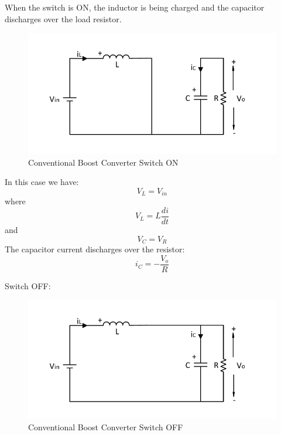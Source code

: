 When the switch is ON,
the inductor is being charged and the capacitor discharges over the load resistor.

\begin{figure}[H]
   \centering
   \includegraphics[width=\textwidth]{figures/aConventionalBoost/ConventionalBoostConverterON.pdf}
    \caption{Conventional Boost Converter Switch ON}
	\label{fig:ConventionalBoostONN}
\end{figure}

In this case we have:
\begin{equation}
	V_L = V_{in}
	\label{eq:pumpHeadModel}
\end{equation}
where
\begin{equation}
	V_L = L \frac{di}{dt}
	\label{eq:pumpHeadModel}
\end{equation}
and
\begin{equation}
	V_C = V_R
	\label{eq:pumpHeadMode2}
\end{equation}
The capacitor current discharges over the resistor:
\begin{equation}
	i_C = -\frac{V_o}{R}
	\label{eq:pumpHeadMode3}
\end{equation}


Switch OFF:

\begin{figure}[H]
   \centering
   \includegraphics[width=\textwidth]{figures/aConventionalBoost/ConventionalBoostConverterOFF.pdf}
    \caption{Conventional Boost Converter Switch OFF}
	\label{fig:ConventionalBoostOFF}
\end{figure}

